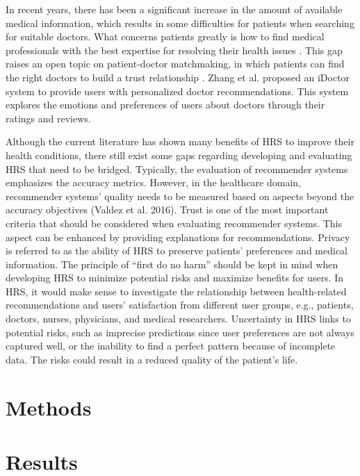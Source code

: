 In recent years, there has been a significant increase in the amount of available medical information, which results in some difficulties for patients when searching for suitable doctors. What concerns patients greatly is how to find medical professionals with the best expertise for resolving their health issues \cite{narducci_recommender_2015, hoens_reliable_2010}. This gap raises an open topic on patient-doctor matchmaking, in which patients can find the right doctors to build a trust relationship \cite{han_hybrid_2018}.
Zhang et al. \cite{zhang_idoctor_2017} proposed an iDoctor system to provide users with personalized doctor recommendations. This system explores the emotions and preferences of users about doctors through their ratings and reviews.

Although the current literature has shown many benefits of HRS to improve their health conditions, there still exist some gaps regarding developing and evaluating HRS that need to be bridged. Typically, the evaluation of recommender systems emphasizes the accuracy metrics. However, in the healthcare domain, recommender systems' quality needs to be measured based on aspects beyond the accuracy objectives (Valdez et al. 2016). Trust is one of the most important criteria that should be considered when evaluating recommender systems. This aspect can be enhanced by providing explanations for recommendations. Privacy is referred to as the ability of HRS to preserve patients' preferences and medical information. The principle of ``first do no harm'' should be kept in mind when developing HRS to minimize potential risks and maximize benefits for users. In HRS, it would make sense to investigate the relationship between health-related recommendations and users' satisfaction from different user groups, e.g., patients, doctors, nurses, physicians, and medical researchers. Uncertainty in HRS links to potential risks, such as imprecise predictions since user preferences are not always captured well, or the inability to find a perfect pattern because of incomplete data. The risks could result in a reduced quality of the patient's life.

\section{Methods}

\section{Results}

